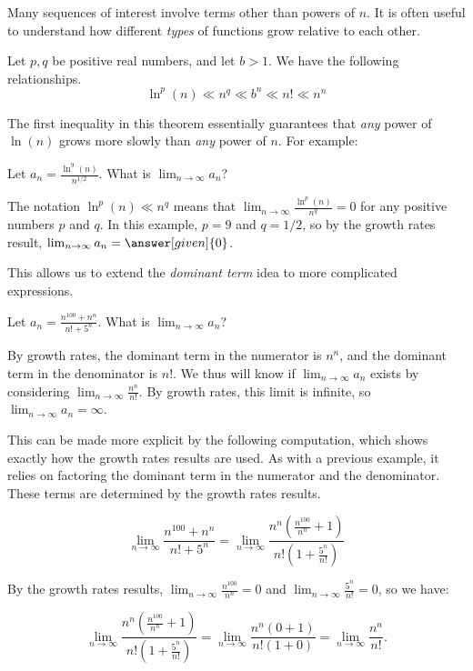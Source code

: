 \documentclass{ximera}
\begin{document}
Many sequences of interest involve terms other than powers of $n$.  It is often useful to understand how different \emph{types} of functions grow relative to each other.

\begin{theorem}
  Let $p,q$ be positive real numbers, and let $b> 1$. We have the
  following relationships.
  \[
  \ln^p(n)\ll n^q \ll b^n \ll n! \ll n^n
  \]
\end{theorem}



The first inequality in this theorem essentially guarantees that \emph{any} power of $\ln(n)$ grows more slowly than \emph{any} power of $n$.  For example: 

\begin{example}
  Let $a_n  = \frac{\ln^{9}(n)}{n^{1/2}}$.  What is $\lim_{n \to \infty} a_n$?
  
  \begin{explanation}
  The notation  $\ln^p(n)\ll n^q$ means that $\lim_{n \to \infty} \frac{\ln^p(n)}{n^q} = 0$ for any positive numbers $p$ and $q$.  In this example, $p=9$ and $q=1/2$, so by the growth rates result, $\lim_{n\to\infty}a_n =\answer[given]{0}$.  
  
  \end{explanation}
\end{example}

This allows us to extend the \emph{dominant term} idea to more complicated expressions.

\begin{example}
  Let $a_n  = \frac{n^{100} + n^n}{n!+5^n}$.  What is $\lim_{n \to \infty} a_n$?
  
  \begin{explanation}
  By growth rates, the dominant term in the numerator is $n^n$, and the dominant term in the denominator is $n!$.  We thus will know if $\lim_{n \to \infty} a_n$ exists by considering $\lim_{n \to \infty} \frac{n^n}{n!}$.  By growth rates, this limit is infinite, so $\lim_{n \to \infty} a_n = \infty$.
  
This can be made more explicit by the following computation, which shows exactly how the growth rates results are used.  As with a previous example, it relies on factoring the dominant term in the numerator and the denominator.  These terms are determined by the growth rates results.

\[
\lim_{n \to \infty} \frac{n^{100} + n^n}{n!+5^n} = \lim_{n \to \infty} \frac{n^n \left(\frac{n^{100}}{n^n} + 1\right)}{n!\left(1+\frac{5^n}{n!}\right)} 
\]

By the growth rates results, $\lim_{n \to \infty} \frac{n^{100}}{n^n} =0$ and  $\lim_{n \to \infty}\frac{5^n}{n!} =0$, so we have: 
  
 \[  \lim_{n \to \infty} \frac{n^n \left(\frac{n^{100}}{n^n} + 1\right)}{n!\left(1+\frac{5^n}{n!}\right)} =   \lim_{n \to \infty} \frac{n^n \left(0 + 1\right)}{n!\left(1+0\right)} = \lim_{n \to \infty} \frac{n^n}{n!}.  \]
   
   
  \end{explanation}
\end{example}
\end{document}
